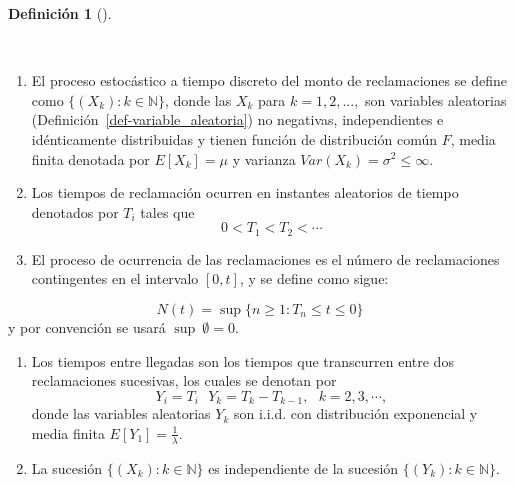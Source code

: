 \documentclass[
  us-letterpaper,
]{scrreprt}
\theoremstyle{plain}
\theoremstyle{plain}
\theoremstyle{definition}
\newtheorem{definition}{Definición}[chapter]
\theoremstyle{remark}
\begin{document}
\begin{definition}[]\protect\hypertarget{def-1}{}\label{def-1}

~

\begin{enumerate}
\def\labelenumi{\arabic{enumi}.}
\item
  El proceso estocástico a tiempo discreto del monto de reclamaciones se
  define como \(\{(X_k): {k \in \mathbb{N} }\}\), donde las \(X_k\) para
  \(k = 1, 2, ...,\) son variables aleatorias
  (Definición~\ref{def-variable_aleatoria}) no negativas, independientes
  e idénticamente distribuidas y tienen función de distribución común
  \(F\), media finita denotada por \(E[X_k] = \mu\) y varianza
  \(Var(X_k) = \sigma^2 \leq \infty\).
\item
  Los tiempos de reclamación ocurren en instantes aleatorios de tiempo
  denotados por \(T_i\) tales que \[ 0 < T_1 < T_2 < \dotsb\]
\item
  El proceso de ocurrencia de las reclamaciones es el número de
  reclamaciones contingentes en el intervalo \([0,t]\), y se define como
  sigue:
\end{enumerate}

\[N(t) = \sup \{n \geq 1: T_n \leq t  \leq 0\}\] y por convención se
usará \(\sup \ \emptyset = 0\).

\begin{enumerate}
\def\labelenumi{\arabic{enumi}.}
\setcounter{enumi}{3}
\item
  Los tiempos entre llegadas son los tiempos que transcurren entre dos
  reclamaciones sucesivas, los cuales se denotan por
  \[Y_i = T_i \ \ \ Y_k= T_k - T_{k-1}, \ \ \ k = 2,3, \dotsb,\]donde
  las variables aleatorias \(Y_k\) son i.i.d. con distribución
  exponencial y media finita \(E[Y_1] =\frac{1}{\lambda}\).
\item
  La sucesión \(\{(X_k): k \in \mathbb{N}\}\) es independiente de la
  sucesión \(\{(Y_k):k\in \mathbb{N}\}.\)
\end{enumerate}

\end{definition}
\end{document}

